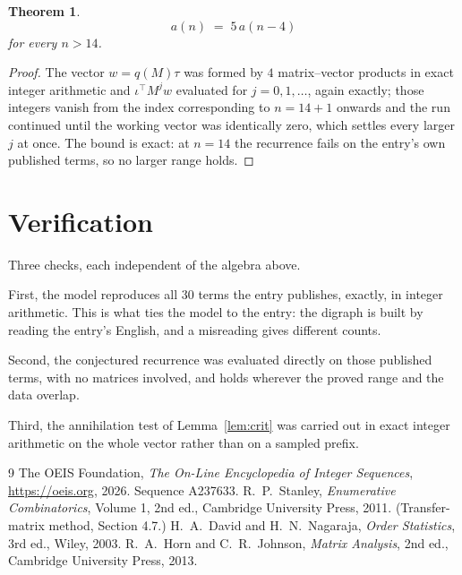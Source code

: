\documentclass[11pt,a4paper]{article}
\theoremstyle{plain}
\newtheorem{theorem}{Theorem}
\theoremstyle{definition}
\begin{document}
\begin{theorem}
\[
a(n)\;=\;5\,a(n-4)
\]
for every $n>14$.
\end{theorem}

\begin{proof}
The vector $w=q(M)\tau$ was formed by $4$ matrix--vector products in exact integer
arithmetic and $\iota^{\!\top}M^{j}w$ evaluated for $j=0,1,\dots$, again exactly; those
integers vanish from the index corresponding to $n=14+1$ onwards and the run continued
until the working vector was identically zero, which settles every larger $j$ at once. The bound is exact: at $n=14$ the recurrence fails on the entry's own published terms, so no larger range holds.
\end{proof}

\section{Verification}

Three checks, each independent of the algebra above.

First, the model reproduces all $30$ terms the entry publishes, exactly, in integer
arithmetic. This is what ties the model to the entry: the digraph is built by reading the
entry's English, and a misreading gives different counts.

Second, the conjectured recurrence was evaluated directly on those published terms, with no
matrices involved, and holds wherever the proved range and the data overlap.

Third, the annihilation test of Lemma~\ref{lem:crit} was carried out in exact integer
arithmetic on the whole vector rather than on a sampled prefix.

\begin{thebibliography}{9}
 The OEIS Foundation, \emph{The On-Line Encyclopedia of Integer
Sequences}, \url{https://oeis.org}, 2026. Sequence A237633.
 R.~P.~Stanley, \emph{Enumerative Combinatorics}, Volume 1, 2nd ed.,
Cambridge University Press, 2011. (Transfer-matrix method, Section 4.7.)
 H.~A.~David and H.~N.~Nagaraja, \emph{Order Statistics}, 3rd ed., Wiley,
2003.
 R.~A.~Horn and C.~R.~Johnson, \emph{Matrix Analysis}, 2nd ed., Cambridge
University Press, 2013.
\end{thebibliography}
\end{document}
